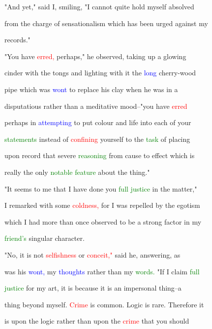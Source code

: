  "And yet," said I, \textcolor{BurntOrange}{smiling,} "I cannot quite hold myself absolved

 from the charge of sensationalism which has been urged against my

 records."



 "You have \textcolor{red}{erred,} perhaps," he observed, taking up a \textcolor{BurntOrange}{glowing}

 cinder with the tongs and lighting with it the \textcolor{blue}{long} cherry-wood

 pipe which was \textcolor{blue}{wont} to replace his clay when he was in a

 disputatious rather than a meditative mood--"you have \textcolor{red}{erred}

 perhaps in \textcolor{blue}{attempting} to put colour and life into each of your

 \textcolor{green}{statements} instead of \textcolor{red}{confining} yourself to the \textcolor{green}{task} of placing

 upon record that severe \textcolor{green}{reasoning} from cause to effect which is

 really the only \textcolor{green}{notable} \textcolor{green}{feature} about the thing."



 "It seems to me that I have done you \textcolor{green}{full} \textcolor{green}{justice} in the matter,"

 I remarked with some \textcolor{red}{coldness,} for I was repelled by the egotism

 which I had more than once observed to be a strong factor in my

 \textcolor{green}{friend's} singular character.



 "No, it is not \textcolor{red}{selfishness} or \textcolor{red}{conceit,"} said he, answering, as

 was his \textcolor{blue}{wont,} my \textcolor{blue}{thoughts} rather than my \textcolor{green}{words.} "If I claim \textcolor{green}{full}

 \textcolor{green}{justice} for my \textcolor{BurntOrange}{art,} it is because it is an impersonal thing--a

 thing beyond myself. \textcolor{red}{Crime} is common. Logic is rare. Therefore it

 is upon the logic rather than upon the \textcolor{red}{crime} that you should

